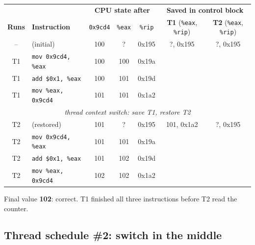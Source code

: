 \documentclass[11pt,a4paper]{article}
\newcommand{\eax}{\texttt{\%eax}}
\newcommand{\rip}{\texttt{\%rip}}
\begin{document}
\begin{center}
\renewcommand{\arraystretch}{1.1}
\setlength{\tabcolsep}{5pt}
\begin{tabular}{@{}clccc|cc@{}}
  \toprule
  & & \multicolumn{3}{c|}{\textbf{CPU state after}} & \multicolumn{2}{c}{\textbf{Saved in control block}} \\
  \textbf{Runs} & \textbf{Instruction} & \texttt{0x9cd4} & \eax & \rip & \textbf{T1} (\eax, \rip) & \textbf{T2} (\eax, \rip) \\
  \midrule
  --  & (initial)                   & 100 & ?   & 0x195 & ?, 0x195   & ?, 0x195 \\
  T1  & \texttt{mov 0x9cd4, \%eax}  & 100 & 100 & 0x19a & & \\
  T1  & \texttt{add \$0x1, \%eax}   & 100 & 101 & 0x19d & & \\
  T1  & \texttt{mov \%eax, 0x9cd4}  & 101 & 101 & 0x1a2 & & \\
  \midrule
  \multicolumn{7}{c}{\textit{thread context switch: save T1, restore T2}} \\
  \midrule
  T2  & (restored)                  & 101 & ?   & 0x195 & 101, 0x1a2 & ?, 0x195 \\
  T2  & \texttt{mov 0x9cd4, \%eax}  & 101 & 101 & 0x19a & & \\
  T2  & \texttt{add \$0x1, \%eax}   & 101 & 102 & 0x19d & & \\
  T2  & \texttt{mov \%eax, 0x9cd4}  & 102 & 102 & 0x1a2 & & \\
  \bottomrule
\end{tabular}
\end{center}

Final value \textbf{102}: correct. T1 finished all three instructions
before T2 read the counter.

\subsection{Thread schedule \#2: switch in the middle}
\end{document}
